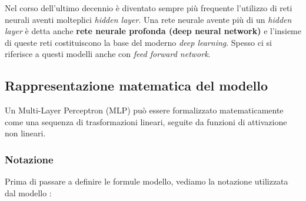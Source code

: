 Nel corso dell’ultimo decennio è diventato sempre più frequente l’utilizzo di reti 
neurali aventi molteplici \textit{hidden layer}. Una rete neurale avente più di 
un \textit{hidden layer} è detta anche \textbf{rete neurale profonda (deep neural network)} e l’insieme di queste 
reti costituiscono la base del moderno \textit{deep learning}.
Spesso ci si riferisce a questi modelli anche con \textit{feed forward network}.

\subsection{Rappresentazione matematica del modello}
Un Multi-Layer Perceptron (MLP) può essere formalizzato matematicamente 
come una sequenza di trasformazioni lineari, seguite da funzioni di attivazione 
non lineari. 
\subsubsection{Notazione}
Prima di passare a definire le formule modello, vediamo la notazione
utilizzata dal modello 
\cite{GradientDescent_NeuralNetworks,ALL_DEEP_LEARNING,ASPETTI_MLP_1,ASPETTI_MLP_2}:

